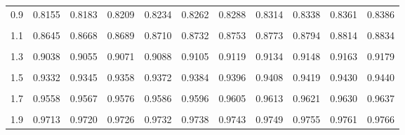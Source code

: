 \documentclass[
]{article}
\begin{document}
\begin{longtable}[l]{lcccccccccc}
0.9 & 0.8155 & 0.8183 & 0.8209 & 0.8234 & 0.8262 & 0.8288 & 0.8314 & 0.8338 & 0.8361 & 0.8386\\
\cellcolor{gray!15}{1} & \cellcolor{gray!15}{0.8409} & \cellcolor{gray!15}{0.8434} & \cellcolor{gray!15}{0.8458} & \cellcolor{gray!15}{0.8481} & \cellcolor{gray!15}{0.8504} & \cellcolor{gray!15}{0.8528} & \cellcolor{gray!15}{0.8553} & \cellcolor{gray!15}{0.8577} & \cellcolor{gray!15}{0.8601} & \cellcolor{gray!15}{0.8623}\\
1.1 & 0.8645 & 0.8668 & 0.8689 & 0.8710 & 0.8732 & 0.8753 & 0.8773 & 0.8794 & 0.8814 & 0.8834\\
\cellcolor{gray!15}{1.2} & \cellcolor{gray!15}{0.8854} & \cellcolor{gray!15}{0.8874} & \cellcolor{gray!15}{0.8894} & \cellcolor{gray!15}{0.8913} & \cellcolor{gray!15}{0.8933} & \cellcolor{gray!15}{0.8950} & \cellcolor{gray!15}{0.8969} & \cellcolor{gray!15}{0.8987} & \cellcolor{gray!15}{0.9004} & \cellcolor{gray!15}{0.9020}\\
1.3 & 0.9038 & 0.9055 & 0.9071 & 0.9088 & 0.9105 & 0.9119 & 0.9134 & 0.9148 & 0.9163 & 0.9179\\
\cellcolor{gray!15}{1.4} & \cellcolor{gray!15}{0.9193} & \cellcolor{gray!15}{0.9207} & \cellcolor{gray!15}{0.9222} & \cellcolor{gray!15}{0.9238} & \cellcolor{gray!15}{0.9252} & \cellcolor{gray!15}{0.9265} & \cellcolor{gray!15}{0.9278} & \cellcolor{gray!15}{0.9294} & \cellcolor{gray!15}{0.9307} & \cellcolor{gray!15}{0.9320}\\
1.5 & 0.9332 & 0.9345 & 0.9358 & 0.9372 & 0.9384 & 0.9396 & 0.9408 & 0.9419 & 0.9430 & 0.9440\\
\cellcolor{gray!15}{1.6} & \cellcolor{gray!15}{0.9452} & \cellcolor{gray!15}{0.9464} & \cellcolor{gray!15}{0.9476} & \cellcolor{gray!15}{0.9489} & \cellcolor{gray!15}{0.9500} & \cellcolor{gray!15}{0.9511} & \cellcolor{gray!15}{0.9521} & \cellcolor{gray!15}{0.9531} & \cellcolor{gray!15}{0.9541} & \cellcolor{gray!15}{0.9549}\\
1.7 & 0.9558 & 0.9567 & 0.9576 & 0.9586 & 0.9596 & 0.9605 & 0.9613 & 0.9621 & 0.9630 & 0.9637\\
\cellcolor{gray!15}{1.8} & \cellcolor{gray!15}{0.9645} & \cellcolor{gray!15}{0.9653} & \cellcolor{gray!15}{0.9659} & \cellcolor{gray!15}{0.9666} & \cellcolor{gray!15}{0.9673} & \cellcolor{gray!15}{0.9680} & \cellcolor{gray!15}{0.9687} & \cellcolor{gray!15}{0.9693} & \cellcolor{gray!15}{0.9700} & \cellcolor{gray!15}{0.9707}\\
1.9 & 0.9713 & 0.9720 & 0.9726 & 0.9732 & 0.9738 & 0.9743 & 0.9749 & 0.9755 & 0.9761 & 0.9766\\

\end{longtable}
\end{document}
